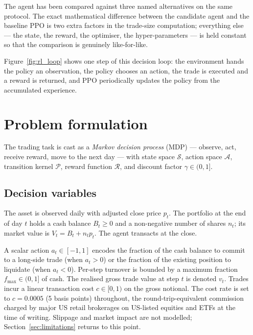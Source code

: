 The agent has been compared against three named alternatives on the same protocol. The exact mathematical difference between the candidate agent and the baseline PPO is two extra factors in the trade-size computation; everything else --- the state, the reward, the optimiser, the hyper-parameters --- is held constant so that the comparison is genuinely like-for-like.

Figure~\ref{fig:rl_loop} shows one step of this decision loop: the environment hands the policy an observation, the policy chooses an action, the trade is executed and a reward is returned, and PPO periodically updates the policy from the accumulated experience.



\section{Problem formulation}
\label{sec:problem_formulation}

The trading task is cast as a \emph{Markov decision process} (MDP) --- observe, act, receive reward, move to the next day --- with state space $\mathcal{S}$, action space $\mathcal{A}$, transition kernel $\mathcal{P}$, reward function $\mathcal{R}$, and discount factor $\gamma \in (0, 1]$.

\subsection{Decision variables}
\label{sec:decision_variables}

The asset is observed daily with adjusted close price $p_t$. The portfolio at the end of day $t$ holds a cash balance $B_t \geq 0$ and a non-negative number of shares $n_t$; its market value is $V_t = B_t + n_t p_t$. The agent transacts at the close.

A scalar action $a_t \in [-1, 1]$ encodes the fraction of the cash balance to commit to a long-side trade (when $a_t > 0$) or the fraction of the existing position to liquidate (when $a_t < 0$). Per-step turnover is bounded by a maximum fraction $f_{\max} \in (0, 1]$ of cash. The realised gross trade value at step $t$ is denoted $v_t$. Trades incur a linear transaction cost $c \in [0, 1)$ on the gross notional. The cost rate is set to $c = 0.0005$ (5 basis points) throughout, the round-trip-equivalent commission charged by major US retail brokerages on US-listed equities and ETFs at the time of writing. Slippage and market impact are not modelled; Section~\ref{sec:limitations} returns to this point.


